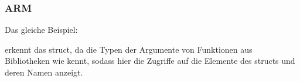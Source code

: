 \subsubsection{ARM}

\myparagraph{\OptimizingKeilVI (\ThumbMode)}

Das gleiche Beispiel:



\myparagraph{\OptimizingXcodeIV (\ThumbTwoMode)}
\IDA erkennt das  struct, da \IDA die Typen der Argumente von Funktionen aus Bibliotheken wie 
kennt, sodass \IDA hier die Zugriffe auf die Elemente des structs und deren Namen anzeigt.


